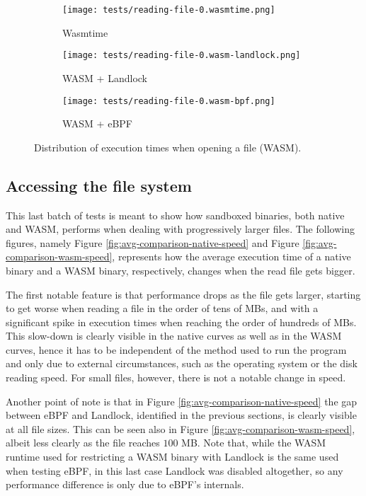 \begin{figure}[ht]
  \centering
  \begin{subfigure}[b]{0.32\textwidth}
    \centering
    \texttt{[image: tests/reading-file-0.wasmtime.png]}
    \caption{Wasmtime}
  \end{subfigure}
  \begin{subfigure}[b]{0.32\textwidth}
    \centering
    \texttt{[image: tests/reading-file-0.wasm-landlock.png]}
    \caption{WASM + Landlock}
  \end{subfigure}
  \begin{subfigure}[b]{0.32\textwidth}
    \centering
    \texttt{[image: tests/reading-file-0.wasm-bpf.png]}
    \caption{WASM + eBPF}
  \end{subfigure}
  \caption{Distribution of execution times when opening a file (WASM).}
  \label{fig:distribution-opening-wasm}
\end{figure}

\subsection{Accessing the file system}

This last batch of tests is meant to show how sandboxed binaries, both native and WASM, performs when
dealing with progressively larger files.
The following figures, namely Figure \ref{fig:avg-comparison-native-speed} and Figure \ref{fig:avg-comparison-wasm-speed},
represents how the average execution time of a native binary and a WASM binary, respectively, changes
when the read file gets bigger.

The first notable feature is that performance drops as the file gets larger,
starting to get worse when reading a file in the order of tens of MBs, and with a significant
spike in execution times when reaching the order of hundreds of MBs.
This slow-down is clearly visible in the native curves as well as in the WASM curves,
hence it has to be independent of the method used to run the
program and only due to external circumstances, such as the operating system or the disk reading speed.
For small files, however, there is not a notable change in speed.

Another point of note is that in Figure \ref{fig:avg-comparison-native-speed} the gap between eBPF and Landlock,
identified in the previous sections, is clearly visible at all file sizes.
This can be seen also in Figure \ref{fig:avg-comparison-wasm-speed}, albeit less clearly as the file reaches $100$ MB.
Note that, while the WASM runtime used for restricting a WASM binary with Landlock is the same used when testing eBPF,
in this last case Landlock was disabled altogether, so any performance difference is only due to eBPF's internals.

